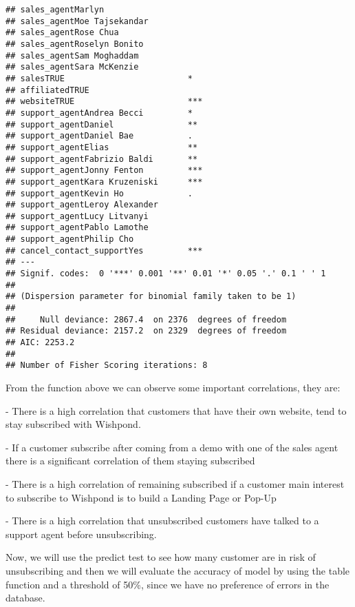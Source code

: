 \documentclass[]{article}
\newenvironment{Shaded}{\begin{snugshade}}{\end{snugshade}}
\newcommand{\KeywordTok}[1]{\textcolor[rgb]{0.13,0.29,0.53}{\textbf{#1}}}
\newcommand{\DataTypeTok}[1]{\textcolor[rgb]{0.13,0.29,0.53}{#1}}
\newcommand{\FloatTok}[1]{\textcolor[rgb]{0.00,0.00,0.81}{#1}}
\newcommand{\StringTok}[1]{\textcolor[rgb]{0.31,0.60,0.02}{#1}}
\newcommand{\CommentTok}[1]{\textcolor[rgb]{0.56,0.35,0.01}{\textit{#1}}}
\newcommand{\OperatorTok}[1]{\textcolor[rgb]{0.81,0.36,0.00}{\textbf{#1}}}
\newcommand{\NormalTok}[1]{#1}
\begin{document}
\begin{verbatim}
## sales_agentMarlyn                    
## sales_agentMoe Tajsekandar           
## sales_agentRose Chua                 
## sales_agentRoselyn Bonito            
## sales_agentSam Moghaddam             
## sales_agentSara McKenzie             
## salesTRUE                         *  
## affiliatedTRUE                       
## websiteTRUE                       ***
## support_agentAndrea Becci         *  
## support_agentDaniel               ** 
## support_agentDaniel Bae           .  
## support_agentElias                ** 
## support_agentFabrizio Baldi       ** 
## support_agentJonny Fenton         ***
## support_agentKara Kruzeniski      ***
## support_agentKevin Ho             .  
## support_agentLeroy Alexander         
## support_agentLucy Litvanyi           
## support_agentPablo Lamothe           
## support_agentPhilip Cho              
## cancel_contact_supportYes         ***
## ---
## Signif. codes:  0 '***' 0.001 '**' 0.01 '*' 0.05 '.' 0.1 ' ' 1
## 
## (Dispersion parameter for binomial family taken to be 1)
## 
##     Null deviance: 2867.4  on 2376  degrees of freedom
## Residual deviance: 2157.2  on 2329  degrees of freedom
## AIC: 2253.2
## 
## Number of Fisher Scoring iterations: 8
\end{verbatim}

From the function above we can observe some important correlations, they
are:

- There is a high correlation that customers that have their own
website, tend to stay subscribed with Wishpond.

- If a customer subscribe after coming from a demo with one of the sales
agent there is a significant correlation of them staying subscribed

- There is a high correlation of remaining subscribed if a customer main
interest to subscribe to Wishpond is to build a Landing Page or Pop-Up

- There is a high correlation that unsubscribed customers have talked to
a support agent before unsubscribing.

Now, we will use the predict test to see how many customer are in risk
of unsubscribing and then we will evaluate the accuracy of model by
using the table function and a threshold of 50\%, since we have no
preference of errors in the database.

\begin{Shaded}
\end{Shaded}
\end{document}
